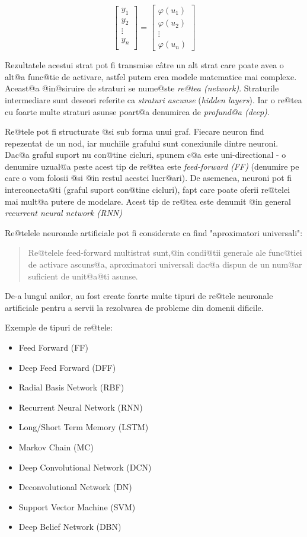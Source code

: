 $$
\begin{bmatrix}
		y_1 \\
		y_2 \\
		\vdots \\ 
		y_n \\
	\end{bmatrix}	
	=
	\begin{bmatrix}
		\varphi (u_1)\\
		\varphi	(u_2) \\
		\vdots \\
		\varphi (u_n)
	\end{bmatrix}
$$

Rezultatele acestui strat pot fi transmise c\^ atre un alt strat care poate avea o alt@a func@tie de activare, astfel putem crea modele matematice mai complexe. Aceast@a @in@siruire de straturi se nume@ste {\sl re@tea (network)}. Straturile intermediare sunt deseori referite ca {\sl straturi ascunse} (\textsl{hidden layers}). Iar o re@tea cu foarte multe straturi asunse poart@a denumirea de {\sl profund@a (deep)}.

Re@tele pot fi structurate @si sub forma unui graf. Fiecare neuron find repezentat de un nod, iar muchiile grafului sunt conexiunile dintre neuroni. Dac@a graful suport nu con@tine cicluri, spunem c@a este uni-directional - o denumire uzual@a peste acest tip de re@tea este {\sl feed-forward (FF)} (denumire pe care o vom folosii @si @in restul acestei lucr@ari). De asemenea, neuroni pot fi interconecta@ti (graful suport con@tine cicluri), fapt care poate oferii re@telei mai mult@a putere de modelare. Acest tip de re@tea este denumit @in general {\sl recurrent neural network (RNN)}

Re@telele neuronale artificiale pot fi considerate ca find "aproximatori universali"\cite{hornik-nn}: 
\begin{quotation}
	Re@telele feed-forward multistrat sunt,@in condi@tii generale ale func@tiei de activare ascuns@a, aproximatori universali dac@a dispun de un num@ar suficient de unit@a@ti asunse.
\end{quotation}

De-a lungul anilor, au fost create foarte multe tipuri de re@tele neuronale artificiale pentru a servii la rezolvarea de probleme din domenii dificile.

Exemple de tipuri de re@tele:

\begin{itemize}
	\item Feed Forward (FF)
	\item Deep Feed Forward (DFF)
	\item Radial Basis Network (RBF)
	\item Recurrent Neural Network (RNN)
	\item Long/Short Term Memory (LSTM)
	\item Markov Chain (MC)
	\item Deep Convolutional Network (DCN)
	\item Deconvolutional Network (DN)
	\item Support Vector Machine (SVM)
	\item Deep Belief Network (DBN)
\end{itemize}


